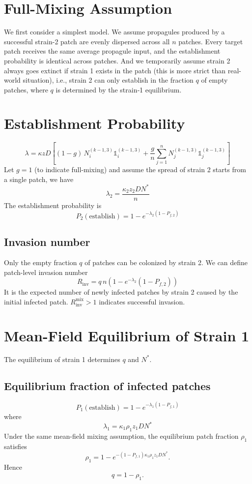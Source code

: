 \documentclass[12pt]{article}
\begin{document}
\section{Full-Mixing Assumption}
We first consider a simplest model. We assume propagules produced by a successful strain-2 patch are evenly dispersed across all $n$ patches. Every target patch receives the same average propagule input, and the establishment probability is identical across patches. And we temporarily assume strain 2 always goes extinct if strain 1 exists in the patch (this is more strict than real-world situation), i.e., strain 2 can only establish in the fraction $q$ of empty patches, where $q$ is determined by the strain‑1 equilibrium.

\section{Establishment Probability}
$$\lambda=
\kappa z D\left[
(1-g)\,N_i^{(k-1,3)}\mathds{1}_i^{(k-1,3)}
+
\frac{g}{n}\sum_{j=1}^n
N_j^{(k-1,3)}\mathds{1}_j^{(k-1,3)}
\right]
$$
Let $g=1$ (to indicate full-mixing) and assume the spread of strain 2 starts from a single patch, we have
$$
\lambda_2=\frac{\kappa_2z_2DN^*  }{n}
$$
The establishment probability is
\[
P_2(\text{establish})
=
1-e^{-\lambda_2(1-P_{f,2})}
\]

\subsection{Invasion number}
Only the empty fraction $q$ of patches can be colonized by strain 2. We can define patch-level invasion number
\[
R_{\mathrm{inv}}
=
q\,n(1-e^{-\lambda_2}(1-P_{f,2}))
\]
It is the expected number of newly infected patches by strain 2 caused by the initial infected patch. $R_\text{inv}^\text{mix}>1$ indicates successful invasion.

\section{Mean-Field Equilibrium of Strain 1}

The equilibrium of strain 1 determines $q$ and $N^*$.

\subsection{Equilibrium fraction of infected patches}
\[
P_1(\text{establish})
=
1-e^{-\lambda_1(1-P_{f,1})}
\]
where 
$$\lambda_1=\kappa_1\rho_1z_1DN^*$$
Under the same mean-field mixing assumption, the equilibrium patch fraction $\rho_1$ satisfies
\[
\rho_1
=
1-e^{-(1-P_{f,1})\kappa_1\rho_1 z_1 D N^*}.
\]
Hence
\[
q=1-\rho_1.
\]
\end{document}
